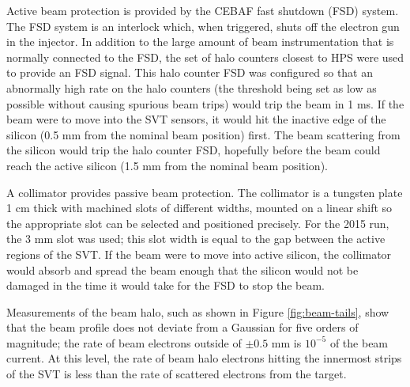Active beam protection is provided by the CEBAF fast shutdown (FSD) system.
The FSD system is an interlock which, when triggered, shuts off the electron gun in the injector.
In addition to the large amount of beam instrumentation that is normally connected to the FSD, the set of halo counters closest to HPS were used to provide an FSD signal.
This halo counter FSD was configured so that an abnormally high rate on the halo counters (the threshold being set as low as possible without causing spurious beam trips) would trip the beam in 1 ms.
If the beam were to move into the SVT sensors, it would hit the inactive edge of the silicon (0.5 mm from the nominal beam position) first.
The beam scattering from the silicon would trip the halo counter FSD, hopefully before the beam could reach the active silicon (1.5 mm from the nominal beam position).

A collimator provides passive beam protection.
The collimator is a tungsten plate 1 cm thick with machined slots of different widths, mounted on a linear shift so the appropriate slot can be selected and positioned precisely.
For the 2015 run, the 3 mm slot was used; this slot width is equal to the gap between the active regions of the SVT.
If the beam were to move into active silicon, the collimator would absorb and spread the beam enough that the silicon would not be damaged in the time it would take for the FSD to stop the beam.

Measurements of the beam halo, such as shown in Figure \ref{fig:beam-tails}, show that the beam profile does not deviate from a Gaussian for five orders of magnitude; the rate of beam electrons outside of $\pm 0.5$ mm is $10^{-5}$ of the beam current.
At this level, the rate of beam halo electrons hitting the innermost strips of the SVT is less than the rate of scattered electrons from the target.


